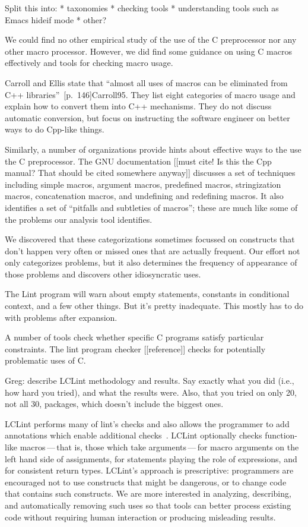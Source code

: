 \documentclass[10pt]{article}
\begin{document}
Split this into:
 * taxonomies
 * checking tools
 * understanding tools such as Emacs hideif mode
 * other?

We could find no other empirical study of the use of the C preprocessor nor
any other macro processor.  However, we did find some guidance on using C macros
effectively and tools for checking macro usage.

Carroll and Ellis state that ``almost all uses of macros can be eliminated
from C++ libraries''~[p.~146]{Carroll95}.  They list eight categories
of macro usage and explain how to convert them into C++ mechanisms.  They
do not discuss automatic conversion, but focus on instructing the software
engineer on better ways to do Cpp-like things.

Similarly, a number of organizations provide hints about effective ways to
the use the C preprocessor.  The GNU documentation [[must cite!  Is this
the Cpp manual?  That should be cited somewhere anyway]]  discusses
a set of techniques including simple macros, argument macros, predefined
macros, stringization macros, concatenation macros, and undefining and
redefining macros.  It also identifies a set of ``pitfalls and subtleties
of macros''; these are much like some of the problems our analysis tool
identifies.

We discovered that these categorizations sometimes focussed on constructs
that don't happen very often or missed ones that are actually frequent.
Our effort not only categorizes problems, but it also determines the
frequency of appearance of those problems and discovers other idiosyncratic
uses.

The Lint program will warn about empty statements, constants in conditional
context, and a few other things.  But it's pretty inadequate.  This mostly
has to do with problems after expansion.

A number of tools check whether specific C programs satisfy particular
constraints.  The lint program checker [[reference]]
checks for potentially problematic uses of C\@.  



Greg:  describe LCLint methodology and results.  Say exactly what you did
(i.e., how hard you tried), and what the results were.  Also, that you tried
on only 20, not all 30, packages, which doesn't include the biggest ones.


LCLint performs many of lint's checks and also
allows the programmer to add annotations which enable additional
checks~\cite{Evans-fse94}.
LCLint optionally checks function-like
macros\,---\,that is, those which take arguments\,---\,for
macro arguments on the left hand side of assignments, for statements
playing the role of expressions, and for consistent return types.
LCLint's approach is prescriptive: programmers are encouraged not to use
constructs that might be dangerous, or to change code that contains such
constructs.  We are more interested in analyzing, describing, and
automatically removing such uses so that tools can better process existing
code without requiring human interaction or producing misleading results.
\end{document}
